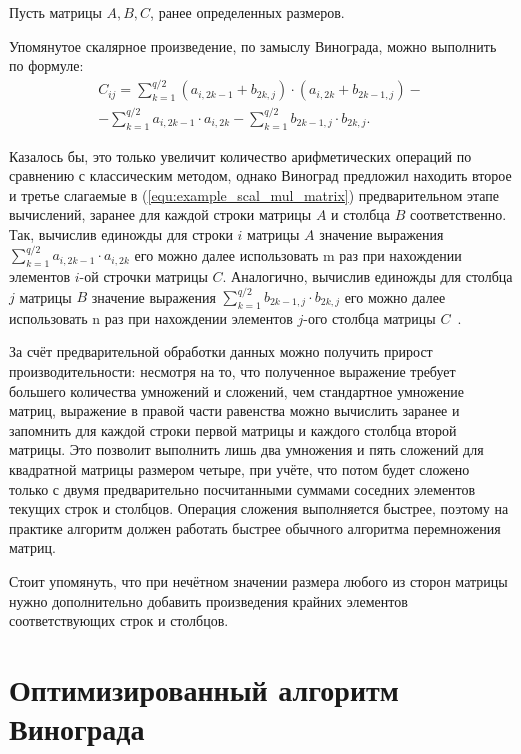 Пусть матрицы $A, B, C$, ранее определенных размеров.

Упомянутое скалярное произведение, по замыслу Винограда, можно выполнить по формуле:
\begin{equation}
	\label{equ:example_scal_mul_matrix}
	\begin{gathered}
		C_{ij} = \sum_{k=1}^{q/2}(a_{i,2k-1} + b_{2k,j})\cdot(a_{i,2k} + b_{2k-1,j}) -\\
		- \sum_{k=1}^{q/2} a_{i,2k-1}\cdot a_{i,2k} - \sum_{k=1}^{q/2} b_{2k-1,j}\cdot b_{2k,j}.
	\end{gathered}
\end{equation}

Казалось бы, это только увеличит количество арифметических операций по сравнению с классическим методом, однако Виноград предложил находить второе и третье слагаемые в (\ref{equ:example_scal_mul_matrix}) предварительном этапе вычислений, заранее для каждой строки матрицы $A$ и столбца $B$ соответственно.
Так, вычислив единожды для строки $i$ матрицы $A$ значение выражения $\sum_{k=1}^{q/2}a_{i,2k-1}\cdot a_{i,2k}$ его можно далее использовать m раз при нахождении элементов $i$-ой строчки матрицы $C$.
Аналогично, вычислив единожды для столбца $j$ матрицы $B$ значение выражения $\sum_{k=1}^{q/2} b_{2k-1,j}\cdot b_{2k,j}$ его можно далее использовать n раз при нахождении элементов $j$-ого столбца матрицы $C$~\cite{book_vinograd}.

За счёт предварительной обработки данных можно получить прирост производительности: несмотря на то, что полученное выражение требует большего количества умножений и сложений, чем стандартное умножение матриц, выражение в правой части равенства можно вычислить заранее и запомнить для каждой строки первой матрицы и каждого столбца второй матрицы.
Это позволит выполнить лишь два умножения и пять сложений для квадратной матрицы размером четыре, при учёте, что потом будет сложено только с двумя предварительно посчитанными суммами соседних элементов текущих строк и столбцов. Операция сложения выполняется
быстрее, поэтому на практике алгоритм должен работать быстрее обычного алгоритма перемножения матриц.

Стоит упомянуть, что при нечётном значении размера любого из сторон матрицы нужно дополнительно добавить произведения крайних элементов соответствующих строк и столбцов.

\section{Оптимизированный алгоритм Винограда}

